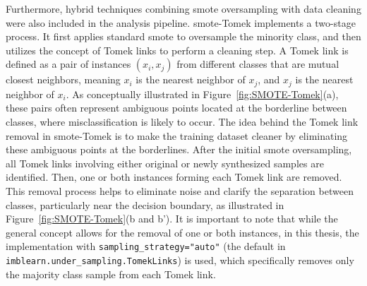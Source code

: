 \documentclass[12pt,a4paper]{report}
\begin{document}
Furthermore, hybrid techniques combining \gls{smote} oversampling with data cleaning were also included in the analysis pipeline. \gls{smote}-Tomek \cite{Batista2004Study} implements a two-stage process. It first applies standard \gls{smote} to oversample the minority class, and then utilizes the concept of Tomek links to perform a cleaning step. A Tomek link is defined as a pair of instances $(x_i, x_j)$ from different classes that are mutual closest neighbors, meaning $x_i$ is the nearest neighbor of $x_j$, and $x_j$ is the nearest neighbor of $x_i$. As conceptually illustrated in Figure~\ref{fig:SMOTE-Tomek}(a), these pairs often represent ambiguous points located at the borderline between classes, where misclassification is likely to occur. The idea behind the Tomek link removal in \gls{smote}-Tomek is to make the training dataset cleaner by eliminating these ambiguous points at the borderlines. After the initial \gls{smote} oversampling, all Tomek links involving either original or newly synthesized samples are identified. Then, one or both instances forming each Tomek link are removed. This removal process helps to eliminate noise and clarify the separation between classes, particularly near the decision boundary, as illustrated in Figure~\ref{fig:SMOTE-Tomek}(b and b'). It is important to note that while the general concept allows for the removal of one or both instances, in this thesis, the implementation with \texttt{sampling\_strategy="auto"} (the default in \texttt{imblearn.under\_sampling.TomekLinks}) is used, which specifically removes only the majority class sample from each Tomek link.\\
\end{document}
